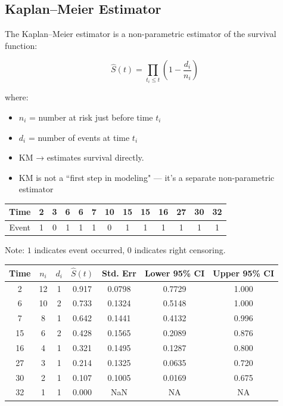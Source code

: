\documentclass[10pt,a4paper]{article}
\begin{document}
\subsection{Kaplan--Meier Estimator}

The Kaplan--Meier estimator is a non-parametric estimator of the survival function:

\[
\hat{S}(t) = \prod_{t_i \leq t} \left(1 - \frac{d_i}{n_i}\right)
\]

where:
\begin{itemize}
 \item $n_i$ = number at risk just before time $t_i$
 \item $d_i$ = number of events at time $t_i$
 \item KM → estimates survival directly.
 \item KM is not a “first step in modeling" — it’s a separate non-parametric estimator
\end{itemize}


\begin{center}
\begin{tabular}{c|cccccccccccc}
\hline
Time  & 2 & 3 & 6 & 6 & 7 & 10 & 15 & 15 & 16 & 27 & 30 & 32 \\
\hline
Event & 1 & 0 & 1 & 1 & 1 & 0 & 1 & 1 & 1 & 1 & 1 & 1 \\
\hline
\end{tabular}
\end{center}

Note: $1$ indicates event occurred, $0$ indicates right censoring.

\begin{center}
\begin{tabular}{ccccccc}
\hline
Time & $n_i$ & $d_i$ & $\hat{S}(t)$ & Std. Err & Lower 95\% CI & Upper 95\% CI \\
\hline
2  & 12 & 1 & 0.917 & 0.0798 & 0.7729 & 1.000 \\
6  & 10 & 2 & 0.733 & 0.1324 & 0.5148 & 1.000 \\
7  & 8  & 1 & 0.642 & 0.1441 & 0.4132 & 0.996 \\
15 & 6  & 2 & 0.428 & 0.1565 & 0.2089 & 0.876 \\
16 & 4  & 1 & 0.321 & 0.1495 & 0.1287 & 0.800 \\
27 & 3  & 1 & 0.214 & 0.1325 & 0.0635 & 0.720 \\
30 & 2  & 1 & 0.107 & 0.1005 & 0.0169 & 0.675 \\
32 & 1  & 1 & 0.000 & NaN    & NA     & NA \\
\hline
\end{tabular}
\end{center}
\end{document}
